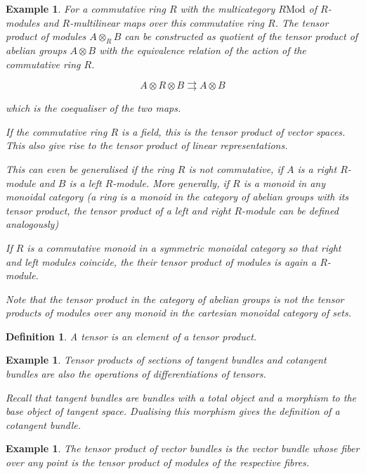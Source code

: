 \documentclass{tufte-book}
\newtheorem{definition}[theorem]{Definition}
\newtheorem{example}[theorem]{Example}
\begin{document}
\begin{example}
  For a commutative ring $R$ with the multicategory $R\mathrm{Mod}$ of $R$-modules and $R$-multilinear maps over this commutative ring $R$. The tensor product of modules $A \otimes_R B$ can be constructed as quotient of the tensor product of abelian groups $A \otimes B$ with the equivalence relation of the action of the commutative ring $R$.

  \begin{equation}
    A \otimes R \otimes B \rightrightarrows A \otimes B
  \end{equation}

  which is the coequaliser of the two maps.

  If the commutative ring $R$ is a field, this is the tensor product of vector spaces. This also give rise to the tensor product of linear representations.

  This can even be generalised if the ring $R$ is not commutative, if $A$ is a right $R$-module and $B$ is a left $R$-module. More generally, if $R$ is a monoid in any monoidal category (a ring is a monoid in the category of abelian groups with its tensor product, the tensor product of a left and right $R$-module can be defined analogously)

  If $R$ is a commutative monoid in a symmetric monoidal category so that right and left modules coincide, the their tensor product of modules is again a $R$-module.

  Note that the tensor product in the category of abelian groups is not the tensor products of modules over any monoid in the cartesian monoidal category of sets.
\end{example}

\begin{definition}
  A tensor is an element of a tensor product.
\end{definition}

\begin{example}
  Tensor products of sections of tangent bundles and cotangent bundles are also the operations of differentiations of tensors.

  Recall that tangent bundles are bundles with a total object and a morphism to the base object of tangent space. Dualising this morphism gives the definition of a cotangent bundle.
\end{example}

\begin{example}
  The tensor product of vector bundles is the vector bundle whose fiber over any point is the tensor product of modules of the respective fibres.
\end{example}
\end{document}
